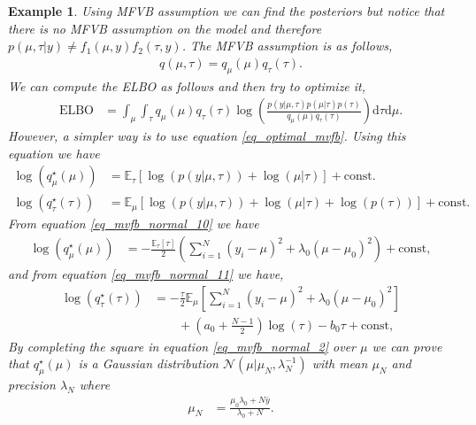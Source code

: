 \documentclass[10pt ]{article}
\newtheorem{example}{Example}
\begin{document}
\begin{example}
{Using MFVB assumption we can find the posteriors but notice that there is no MFVB assumption on the model and therefore $p(\mu, \tau|y) \neq f_1(\mu, y) f_2(\tau, y)$.  The MFVB assumption is as follows,
\begin{align}
q(\mu, \tau) = q_{\mu} (\mu) q_{\tau} (\tau).
\label{eq_mfvb_assumption_toy}
\end{align}
We can compute the ELBO as follows and then try to optimize it,
\begin{align}
\mathrm{ELBO} &= \int_{\mu} \int_{\tau} q_{\mu} (\mu) q_{\tau} (\tau) \log \left(  \frac{ p(y | \mu, \tau) p(\mu | \tau) p(\tau)}{q_{\mu} (\mu) q_{\tau} (\tau)} \right) \mathrm{d} \tau \mathrm{d}\mu.
\label{eq_derivations}
\end{align}
However, a simpler way is to use equation \eqref{eq_optimal_mvfb}. Using this equation we have
\begin{align}
\log \left( q^{\star}_{\mu} (\mu) \right) &= \mathbb{E}_{\tau} \left[ \log \left( p (y | \mu, \tau) \right) + \log(\mu | \tau) \right]  + \mathrm{const}.  
\label{eq_mvfb_normal_10}
\\
\log \left( q^{\star}_{\tau} (\tau) \right) &= \mathbb{E}_{\mu} \left[ \log \left( p (y | \mu, \tau) \right) + \log(\mu | \tau)  + \log (p(\tau))  \right] +  \mathrm{const}. 
\label{eq_mvfb_normal_11}
\end{align}
From equation \eqref{eq_mvfb_normal_10} we have
\begin{align}
\log \left( q_{\mu}^{\star}(\mu) \right) &=  -\frac{\mathbb{E}_{\tau}\left[  \tau \right]}{2}  \left( \sum_{i=1}^N (y_i - \mu)^2 + \lambda_0  (\mu -\mu_0)^2  \right) +  \mathrm{const},
\label{eq_mvfb_normal_2}
\end{align}
and from equation \eqref{eq_mvfb_normal_11} we have, 
\begin{align}
\log \left( q^{\star}_{\tau} (\tau) \right) &=  -\frac{\tau}{2} \mathbb{E}_{\mu}\left[  \sum_{i=1}^N (y_i - \mu)^2 + \lambda_0  (\mu -\mu_0)^2  \right] \nonumber \\
&\qquad + \left( a_0 + \frac{N-1}{2} \right) \log(\tau) - b_0 \tau +  \mathrm{const},
\label{eq_mvfb_normal_3}
\end{align}
By completing the square in equation \eqref{eq_mvfb_normal_2} over $\mu$ we can prove that $ q_{\mu}^{\star}(\mu)$ is a Gaussian distribution $\mathcal{N}(\mu | \mu_N, \lambda_N^{-1})$ with mean $\mu_N$ and precision $\lambda_N$ where 
\begin{align}
\mu_N &= \frac{ \mu_0 \lambda_0 + N \bar{y}}{\lambda_0 + N}.
\label{eq_mvfb_normal_41}

\end{align}}
\end{example}
\end{document}
